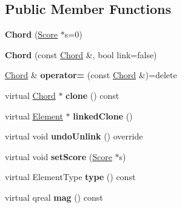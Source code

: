 \subsection*{Public Member Functions}
\begin{DoxyCompactItemize}
\item 
\mbox{\label{class_ms_1_1_chord_a75f4c6582156c012aa0e95c68603a871}} 
{\bfseries Chord} (\hyperlink{class_ms_1_1_score}{Score} $\ast$s=0)
\item 
\mbox{\label{class_ms_1_1_chord_afc8a027ccb337c1371147942100032d2}} 
{\bfseries Chord} (const \hyperlink{class_ms_1_1_chord}{Chord} \&, bool link=false)
\item 
\mbox{\label{class_ms_1_1_chord_a2cea5579daf34fef9c61016f23bc7aa9}} 
\hyperlink{class_ms_1_1_chord}{Chord} \& {\bfseries operator=} (const \hyperlink{class_ms_1_1_chord}{Chord} \&)=delete
\item 
\mbox{\label{class_ms_1_1_chord_a8aea9752f62c8f4c3b412faae3f39dc5}} 
virtual \hyperlink{class_ms_1_1_chord}{Chord} $\ast$ {\bfseries clone} () const
\item 
\mbox{\label{class_ms_1_1_chord_a240dccb6a112056a7158f55675b431aa}} 
virtual \hyperlink{class_ms_1_1_element}{Element} $\ast$ {\bfseries linked\+Clone} ()
\item 
\mbox{\label{class_ms_1_1_chord_abe158a1edb003070a8844814b2998e7a}} 
virtual void {\bfseries undo\+Unlink} () override
\item 
\mbox{\label{class_ms_1_1_chord_af8c2a288f04219e0075bc30c46184d8a}} 
virtual void {\bfseries set\+Score} (\hyperlink{class_ms_1_1_score}{Score} $\ast$s)
\item 
\mbox{\label{class_ms_1_1_chord_a5e5cddd3d7156e4a1960981a293a3be0}} 
virtual Element\+Type {\bfseries type} () const
\item 
\mbox{\label{class_ms_1_1_chord_ae6c18982fb26d34516912044b11c226e}} 
virtual qreal {\bfseries mag} () const
\item 

\end{DoxyCompactItemize}
